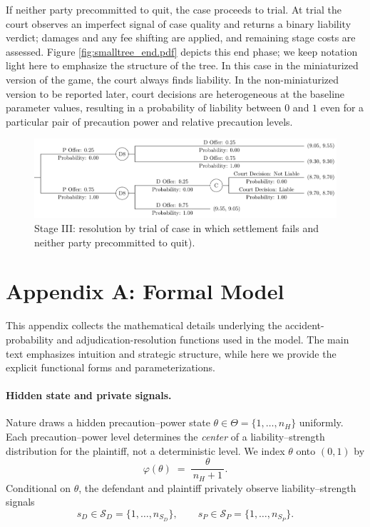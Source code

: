 \documentclass{article}
\begin{document}
If neither party precommitted to quit, the case proceeds to trial. At trial the court observes an imperfect signal of case quality and returns a binary liability verdict; damages and any fee shifting are applied, and remaining stage costs are assessed. Figure \ref{fig:smalltree_end.pdf} depicts this end phase; we keep notation light here to emphasize the structure of the tree. In this case in the miniaturized version of the game, the court always finds liability. In the non-miniaturized version to be reported later, court decisions are heterogeneous at the baseline parameter values, resulting in a probability of liability between $0$ and $1$ even for a particular pair of precaution power and relative precaution levels. 

  \begin{figure}[t]
    \centering
    \includegraphics[width=\textwidth]{../Figures/smalltree_end_adjudication.pdf}
    \caption{Stage III: resolution by trial of case in which settlement fails and neither party precommitted to quit).}
    \label{fig:smalltree_end_adjudication.pdf}
  \end{figure}

\section*{Appendix A: Formal Model}

This appendix collects the mathematical details underlying the accident-probability and adjudication-resolution functions used in the model. The main text emphasizes intuition and strategic structure, while here we provide the explicit functional forms and parameterizations. 
\paragraph{Hidden state and private signals.}
Nature draws a hidden precaution–power state $\theta\in\Theta=\{1,\dots,n_H\}$ uniformly. Each precaution–power level determines the \emph{center} of a liability–strength distribution for the plaintiff, not a deterministic level. We index $\theta$ onto $(0,1)$ by
\[
\varphi(\theta)\;=\;\frac{\theta}{\,n_H+1\,}.
\]
Conditional on $\theta$, the defendant and plaintiff privately observe liability–strength signals
\[
s_D\in\mathcal{S}_D=\{1,\dots,n_{S_D}\},\qquad
s_P\in\mathcal{S}_P=\{1,\dots,n_{S_P}\}.
\]
\end{document}
